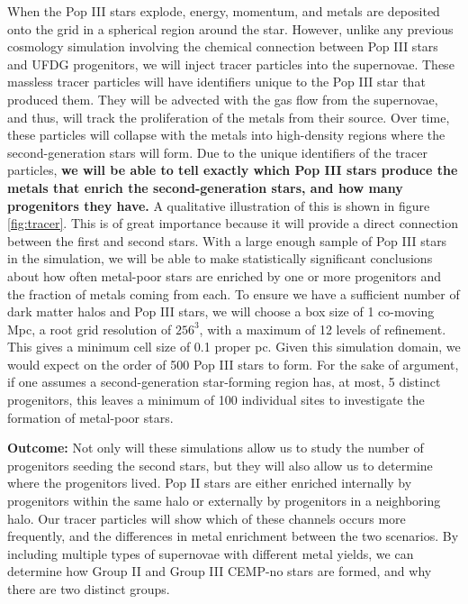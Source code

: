 \documentclass[letterpaper, 12pt]{article}
\begin{document}
When the Pop III stars explode, energy, momentum, and metals are deposited onto the grid in a spherical region around the star. However, unlike any previous cosmology simulation involving the chemical connection between Pop III stars and UFDG progenitors, we will inject tracer particles into the supernovae. These massless tracer particles will have identifiers unique to the Pop III star that produced them. They will be advected with the gas flow from the supernovae, and thus, will track the proliferation of the metals from their source. Over time, these particles will collapse with the metals into high-density regions where the second-generation stars will form. Due to the unique identifiers of the tracer particles, \textbf{we will be able to tell exactly which Pop III stars produce the metals that enrich the second-generation stars, and how many progenitors they have.} A qualitative illustration of this is shown in figure \ref{fig:tracer}. This is of great importance because it will provide a direct connection between the first and second stars. With a large enough sample of Pop III stars in the simulation, we will be able to make statistically significant conclusions about how often metal-poor stars are enriched by one or more progenitors and the fraction of metals coming from each. To ensure we have a sufficient number of dark matter halos and Pop III stars, we will choose a box size of 1 co-moving Mpc, a root grid resolution of $256^3$, with a maximum of 12 levels of refinement. This gives a minimum cell size of 0.1 proper pc. Given this simulation domain, we would expect on the order of 500 Pop III stars to form. For the sake of argument, if one assumes a second-generation star-forming region has, at most, 5 distinct progenitors, this leaves a minimum of 100 individual sites to investigate the formation of metal-poor stars.

\textbf{Outcome:} Not only will these simulations allow us to study the number of progenitors seeding the second stars, but they will also allow us to determine where the progenitors lived. Pop II stars are either enriched internally by progenitors within the same halo or externally by progenitors in a neighboring halo. Our tracer particles will show which of these channels occurs more frequently, and the differences in metal enrichment between the two scenarios. By including multiple types of supernovae with different metal yields, we can determine how Group II and Group III CEMP-no stars are formed, and why there are two distinct groups.

\end{document}
